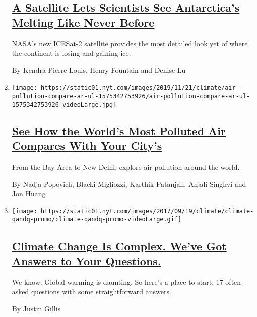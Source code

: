\begin{enumerate}
{  \subsection{\texorpdfstring{\href{/interactive/2020/04/30/climate/antarctica-ice-climate-change.html}{A
  Satellite Lets Scientists See Antarctica's Melting Like Never
  Before}}{A Satellite Lets Scientists See Antarctica's Melting Like Never Before}}\label{a-satellite-lets-scientists-see-antarcticas-melting-like-never-before}}

  NASA's new ICESat-2 satellite provides the most detailed look yet of
  where the continent is losing and gaining ice.

  By Kendra Pierre-Louis, Henry Fountain and Denise Lu
\item
  \texttt{[image: https://static01.nyt.com/images/2019/11/21/climate/air-pollution-compare-ar-ul-1575342753926/air-pollution-compare-ar-ul-1575342753926-videoLarge.jpg]}

  \hypertarget{see-how-the-worlds-most-polluted-air-compares-with-your-citys}{%
  \subsection{\texorpdfstring{\href{/interactive/2019/12/02/climate/air-pollution-compare-ar-ul.html}{See
  How the World's Most Polluted Air Compares With Your
  City's}}{See How the World's Most Polluted Air Compares With Your City's}}\label{see-how-the-worlds-most-polluted-air-compares-with-your-citys}}

  From the Bay Area to New Delhi, explore air pollution around the
  world.

  By Nadja Popovich, Blacki Migliozzi, Karthik Patanjali, Anjali Singhvi
  and Jon Huang
\item
  \texttt{[image: https://static01.nyt.com/images/2017/09/19/climate/climate-qandq-promo/climate-qandq-promo-videoLarge.gif]}

  \hypertarget{climate-change-is-complex-weve-got-answers-to-your-questions}{%
  \subsection{\texorpdfstring{\href{/interactive/2017/climate/what-is-climate-change.html}{Climate
  Change Is Complex. We've Got Answers to Your
  Questions.}}{Climate Change Is Complex. We've Got Answers to Your Questions.}}\label{climate-change-is-complex-weve-got-answers-to-your-questions}}

  We know. Global warming is daunting. So here's a place to start: 17
  often-asked questions with some straightforward answers.

  By Justin Gillis
\end{enumerate}

